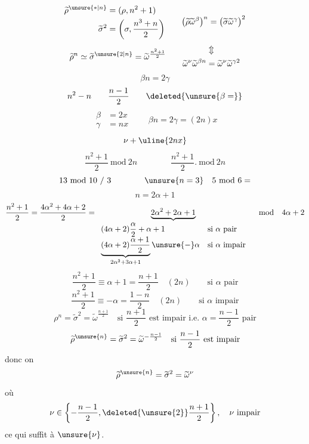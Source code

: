 \[
\begin{aligned}
\widetilde\rho^{\unsure{*|n}}&=(\rho,n^2+1)\\
\widetilde\sigma^{2}&=\left(\sigma,\frac{n^3+n}{2}\right)
\end{aligned}
\qquad
\bigl(\widetilde\rho\widetilde\omega^{\beta}\bigr)^n
=\bigl(\widetilde\sigma\widetilde\omega^{\gamma}\bigr)^2
\]
\[
\widetilde\rho^n\simeq\widetilde\sigma^{\unsure{2|n}}
=\widetilde\omega^{\frac{n^2+1}{2}}
\qquad
\begin{gathered}
\Updownarrow\\
\widetilde\omega^\nu\widetilde\omega^{\beta n}
=\widetilde\omega^\nu\widetilde\omega^{\gamma2}
\end{gathered}
\]
\[
\beta n=2\gamma
\]
\[
n^2-n\qquad\frac{n-1}{2}\qquad\deleted{\unsure{\beta=}}
\]
\[
\begin{aligned}
\beta&=2x\\
\gamma&=nx
\end{aligned}
\qquad
\beta n=2\gamma=(2n)x
\]
\[
\nu+\uline{2nx}
\]
\[
\frac{n^2+1}{2}\ \mathrm{mod}\ 2n
\qquad\qquad
\frac{n^2+1}{2}.\ \mathrm{mod}\ 2n
\]
\[
13\ \mathrm{mod}\ 10\ /\ 3
\qquad\qquad
\unsure{n=3}\quad5\ \mathrm{mod}\ 6=
\]
\[
n=2\alpha+1
\]
\[
\frac{n^2+1}{2}
=\frac{4\alpha^2+4\alpha+2}{2}
=\underbrace{2\alpha^2+2\alpha+1}_{
\begin{array}{ll}
(4\alpha+2)\dfrac{\alpha}{2}+\alpha+1&\text{si }\alpha\text{ pair}\\
\underbrace{(4\alpha+2)\dfrac{\alpha+1}{2}}_{2\alpha^2+3\alpha+1}
\unsure{-}\alpha&\text{si }\alpha\text{ impair}
\end{array}}
\quad\mathrm{mod}\quad4\alpha+2
\]
\[
\frac{n^2+1}{2}\equiv\alpha+1=\frac{n+1}{2}
\quad(2n)\qquad\text{si }\alpha\text{ pair}
\]
\[
\frac{n^2+1}{2}\equiv-\alpha=\frac{1-n}{2}
\quad(2n)\qquad\text{si }\alpha\text{ impair}
\]
\[
\rho^n=\widetilde\sigma^2=\widetilde\omega^{\frac{n+1}{2}}
\quad\text{si }\frac{n+1}{2}\text{ est impair i.e. }\alpha=\frac{n-1}{2}\text{ pair}
\]
\[
\widetilde\rho^{\unsure{n}}=\widetilde\sigma^2
=\widetilde\omega^{-\frac{n-1}{2}}
\quad\text{si }\frac{n-1}{2}\text{ est impair}
\]
donc on  
\[
\widetilde\rho^{\unsure{n}}=\widetilde\sigma^2=\widetilde\omega^\nu
\]
où
\[
\nu\in\left\{-\frac{n-1}{2},\deleted{\unsure{2}}\frac{n+1}{2}\right\},
\quad\nu\text{ impair}
\]
ce qui suffit à  $\unsure{\nu}$.


